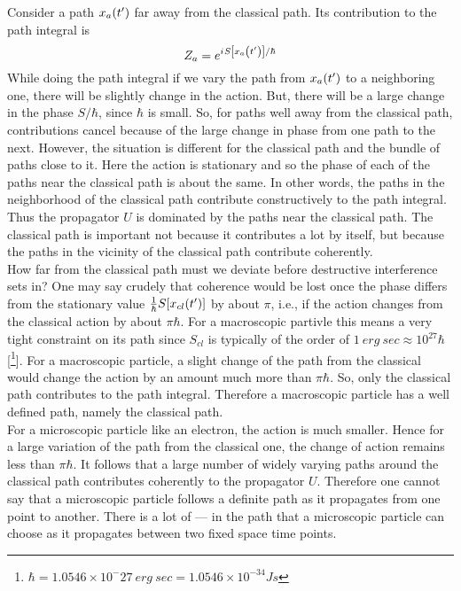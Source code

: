 	
	Consider a path $x_a\qty(t^\prime)$ far away from the classical path. Its contribution to the path integral is
	\begin{equation}
		Z_a = e^{{i\mkern1mu} S\qty[x_a\qty(t^\prime)] / \hbar}
	\end{equation}
	While doing the path integral if we vary the path from $x_a\qty(t^\prime)$ to a neighboring one, there will be slightly change in the action. But, there will be a large change in the phase $S/\hbar$, since $\hbar$ is small. So, for paths well away from the classical path, contributions cancel because of the large change in phase from one path to the next. However, the situation is different for the classical path and the bundle of paths close to it. Here the action is stationary and so the phase of each of the paths near the classical path is about the same. In other words, the paths in the neighborhood of the classical path contribute constructively to the path integral.\\
	
	
	
	Thus the propagator $U$ is dominated by the paths near the classical path. The classical path is important not because it contributes a lot by itself, but because the paths in the vicinity of the classical path contribute coherently.\\
	
	
	How far from the classical path must we deviate before destructive interference sets in? One may say crudely that coherence would be lost once the phase differs from the stationary value $\frac{1}{\hbar} S\qty[x_{cl}(t^\prime)]$ by about $\pi$, i.e., if the action changes from the classical action by about $\pi \hbar$. For a macroscopic partivle this means a very tight constraint on its path since $S_{cl}$ is typically of the order of $1\ erg\ sec \approx 10^{27} \hbar$[\footnote{$\hbar = 1.0546 \times 10^-27 \ erg\ sec = 1.0546 \times 10^{-34} J s$}]. For a macroscopic particle, a slight change of the path from the classical would change the action by an amount much more than $\pi \hbar$. So, only the classical path contributes to the path integral. Therefore a macroscopic particle has a well defined path, namely the classical path. \\
	
	
	For a microscopic particle like an electron, the action is much smaller. Hence for a large variation of the path from the classical one, the change of action remains less than $\pi \hbar$. It follows that a large number of widely varying paths around the classical path contributes coherently to the propagator $U$. Therefore one cannot say that a microscopic particle follows a definite path as it propagates from one point to another. There is  a lot of --- in the path that a microscopic particle can choose as it propagates between two fixed space time points.\\
	
